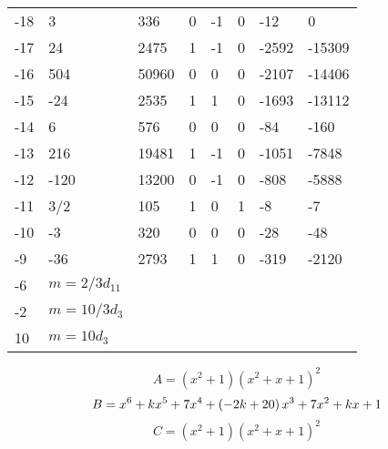 \documentclass{amsart}
\begin{document}
\begin{longtable}{|l|l|l|lllll|}
-18&3&336&0&-1&0&-12&0\\
-17&24&2475&1&-1&0&-2592&-15309\\
-16&504&50960&0&0&0&-2107&-14406\\
-15&-24&2535&1&1&0&-1693&-13112\\
-14&6&576&0&0&0&-84&-160\\
-13&216&19481&1&-1&0&-1051&-7848\\
-12&-120&13200&0&-1&0&-808&-5888\\
-11&3/2&105&1&0&1&-8&-7\\
-10&-3&320&0&0&0&-28&-48\\
-9&-36&2793&1&1&0&-319&-2120\\
-6&$m=2/3d_{11}$&&\multicolumn{5}{c|}{}\\
-2&$m=10/3d_{3}$&&\multicolumn{5}{c|}{}\\
10&$m=10d_{3}$&&\multicolumn{5}{c|}{}\\
\hline
\end{longtable}
$$A=(x^2
 + 1)(x^2
 + x
 + 1)^{2}$$
$$B=x^6
 + k\*x^5
 + 7\*x^4
 + \left(-2\*k
 + 20\right) \*x^3
 + 7\*x^2
 + k\*x
 + 1$$
$$C=(x^2
 + 1)(x^2
 + x
 + 1)^{2}$$
\end{document}
